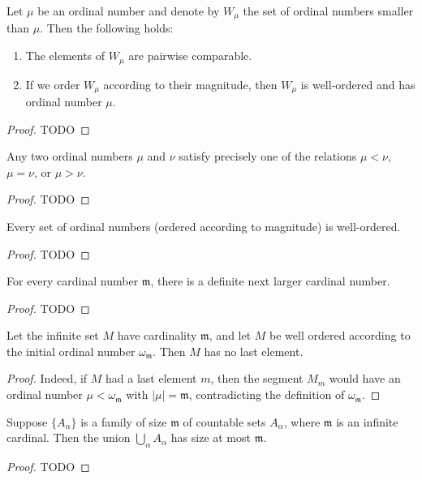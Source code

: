 \begin{proposition}
  \label{ch19proposition1}
  Let \(\mu\) be an ordinal number and denote by \(W_\mu\) the set of
  ordinal numbers smaller than \(\mu\). Then the following holds:
  \begin{enumerate}
    \item The elements of \(W_\mu\) are pairwise comparable.
    \item If we order \(W_\mu\) according to their magnitude, then \(W_\mu\) is well-ordered and
    has ordinal number \(\mu\).
  \end{enumerate}
\end{proposition}
\begin{proof}
  TODO
\end{proof}

\begin{proposition}
  \label{ch19proposition2}
  Any two ordinal numbers \(\mu\) and \(\nu\) satisfy precisely one of
  the relations \(\mu < \nu\), \(\mu = \nu\), or \(\mu > \nu\).
\end{proposition}
\begin{proof}
  TODO
\end{proof}

\begin{proposition}
  \label{ch19proposition3}
  Every set of ordinal numbers (ordered according to magnitude) is well-ordered.
\end{proposition}
\begin{proof}
  TODO
\end{proof}

\begin{proposition}
  \label{ch19proposition4}
  For every cardinal number \(\mathfrak{m}\), there is a definite next larger cardinal number.
\end{proposition}
\begin{proof}
  TODO
\end{proof}

\begin{proposition}
  \label{ch19proposition5}
  Let the infinite set \(M\) have cardinality \(\mathfrak{m}\), and let \(M\) be well ordered
  according to the initial ordinal number \(\omega_{\mathfrak{m}}\). Then \(M\) has no last element.
\end{proposition}
\begin{proof}
  Indeed, if \(M\) had a last element \(m\), then the segment \(M_m\) would have an
  ordinal number \(\mu < \omega_{\mathfrak{m}}\) with \(|\mu| = \mathfrak{m}\),
  contradicting the definition of \(\omega_{\mathfrak{m}}\).
\end{proof}

\begin{proposition}
  \label{ch19proposition6}
  Suppose \(\{A_\alpha\}\) is a family of size \(\mathfrak{m}\) of countable sets \(A_\alpha\),
  where \(\mathfrak{m}\) is an infinite cardinal. Then the union \(\bigcup_\alpha A_\alpha\)
  has size at most \(\mathfrak{m}\).
\end{proposition}
\begin{proof}
  TODO
\end{proof}
